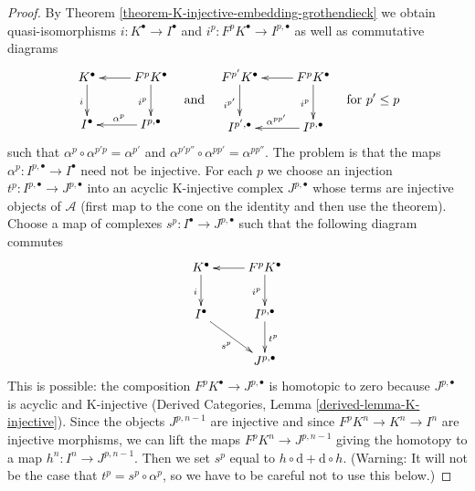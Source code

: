 \documentclass{stacks-project}
\theoremstyle{plain}
\theoremstyle{definition}
\theoremstyle{remark}
\numberwithin{equation}{subsection}
\begin{document}
\begin{proof}
By Theorem \ref{theorem-K-injective-embedding-grothendieck}
we obtain quasi-isomorphisms $i : K^\bullet \to I^\bullet$ and
$i^p : F^pK^\bullet \to I^{p, \bullet}$ as well as commutative diagrams
$$
\vcenter{
\xymatrix{
K^\bullet \ar[d]_i & F^pK^\bullet \ar[l] \ar[d]_{i^p} \\
I^\bullet & I^{p, \bullet} \ar[l]_{\alpha^p}
}
}
\quad\text{and}\quad
\vcenter{
\xymatrix{
F^{p'}K^\bullet \ar[d]_{i^{p'}} &
F^pK^\bullet \ar[l] \ar[d]_{i^p} \\
I^{p', \bullet} &
I^{p, \bullet} \ar[l]_{\alpha^{p p'}}
}
}
\quad\text{for }p' \leq p
$$
such that $\alpha^p \circ \alpha^{p' p} = \alpha^{p'}$
and $\alpha^{p'p''} \circ \alpha^{pp'} = \alpha^{pp''}$.
The problem is that the maps $\alpha^p : I^{p, \bullet} \to I^\bullet$
need not be injective. For each $p$ we choose an injection
$t^p : I^{p, \bullet} \to J^{p, \bullet}$ into an acyclic K-injective
complex $J^{p, \bullet}$ whose terms are injective objects of $\mathcal{A}$
(first map to the cone on the identity and then use the theorem).
Choose a map of complexes $s^p : I^\bullet \to J^{p, \bullet}$
such that the following diagram commutes
$$
\xymatrix{
K^\bullet \ar[d]_i & F^pK^\bullet \ar[l] \ar[d]_{i^p} \\
I^\bullet \ar[rd]_{s^p} & I^{p, \bullet} \ar[d]^{t^p} \\
& J^{p, \bullet}
}
$$
This is possible: the composition $F^pK^\bullet \to J^{p, \bullet}$
is homotopic to zero because $J^{p, \bullet}$ is acyclic and K-injective
(Derived Categories, Lemma \ref{derived-lemma-K-injective}).
Since the objects $J^{p, n - 1}$ are injective and since
$F^pK^n \to K^n \to I^n$ are injective morphisms, we
can lift the maps $F^pK^n \to J^{p, n - 1}$ giving the homotopy
to a map $h^n : I^n \to J^{p, n - 1}$. Then we set $s^p$
equal to $h \circ \text{d} + \text{d} \circ h$.
(Warning: It will not be the case that $t^p = s^p \circ \alpha^p$,
so we have to be careful not to use this below.)


\end{proof}
\end{document}
